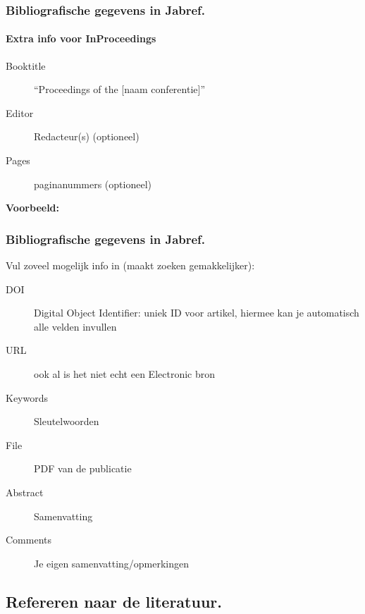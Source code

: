 \documentclass[aspectratio=169]{beamer}
\begin{document}
\begin{frame}[plain]
  \frametitle{Bibliografische gegevens in Jabref.}
  \framesubtitle{Extra info voor InProceedings}

  \begin{description}
    \item[Booktitle] ``Proceedings of the [naam conferentie]''
    \item[Editor] Redacteur(s) (optioneel)
    \item[Pages] paginanummers (optioneel)
  \end{description}

  \medskip

  \textbf{Voorbeeld:}

\end{frame}

\begin{frame}
  \frametitle{Bibliografische gegevens in Jabref.}

  Vul zoveel mogelijk info in (maakt zoeken gemakkelijker):

  \begin{description}
    \item[DOI] Digital Object Identifier: uniek ID voor artikel, hiermee kan je automatisch alle velden invullen
    \item[URL] ook al is het niet echt een Electronic bron
    \item[Keywords] Sleutelwoorden
    \item[File] PDF van de publicatie
    \item[Abstract] Samenvatting
    \item[Comments] Je eigen samenvatting/opmerkingen
  \end{description}

\end{frame}

\subsection{Refereren naar de literatuur.}
\end{document}
